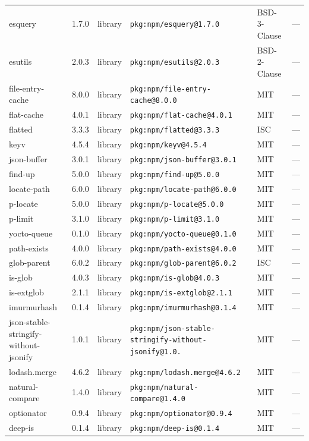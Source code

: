 \documentclass[11pt]{article}
\begin{document}
\begin{longtable}{|l|l|l|p{2.2cm}|l|p{4cm}|}
esquery & 1.7.0 & library & \texttt{pkg:npm/esquery@1.7.0} & BSD-3-Clause & — \\
esutils & 2.0.3 & library & \texttt{pkg:npm/esutils@2.0.3} & BSD-2-Clause & — \\
file-entry-cache & 8.0.0 & library & \texttt{pkg:npm/file-entry-cache@8.0.0} & MIT & — \\
flat-cache & 4.0.1 & library & \texttt{pkg:npm/flat-cache@4.0.1} & MIT & — \\
flatted & 3.3.3 & library & \texttt{pkg:npm/flatted@3.3.3} & ISC & — \\
keyv & 4.5.4 & library & \texttt{pkg:npm/keyv@4.5.4} & MIT & — \\
json-buffer & 3.0.1 & library & \texttt{pkg:npm/json-buffer@3.0.1} & MIT & — \\
find-up & 5.0.0 & library & \texttt{pkg:npm/find-up@5.0.0} & MIT & — \\
locate-path & 6.0.0 & library & \texttt{pkg:npm/locate-path@6.0.0} & MIT & — \\
p-locate & 5.0.0 & library & \texttt{pkg:npm/p-locate@5.0.0} & MIT & — \\
p-limit & 3.1.0 & library & \texttt{pkg:npm/p-limit@3.1.0} & MIT & — \\
yocto-queue & 0.1.0 & library & \texttt{pkg:npm/yocto-queue@0.1.0} & MIT & — \\
path-exists & 4.0.0 & library & \texttt{pkg:npm/path-exists@4.0.0} & MIT & — \\
glob-parent & 6.0.2 & library & \texttt{pkg:npm/glob-parent@6.0.2} & ISC & — \\
is-glob & 4.0.3 & library & \texttt{pkg:npm/is-glob@4.0.3} & MIT & — \\
is-extglob & 2.1.1 & library & \texttt{pkg:npm/is-extglob@2.1.1} & MIT & — \\
imurmurhash & 0.1.4 & library & \texttt{pkg:npm/imurmurhash@0.1.4} & MIT & — \\
json-stable-stringify-without-jsonify & 1.0.1 & library & \texttt{pkg:npm/json-stable-stringify-without-jsonify@1.0.} & MIT & — \\
lodash.merge & 4.6.2 & library & \texttt{pkg:npm/lodash.merge@4.6.2} & MIT & — \\
natural-compare & 1.4.0 & library & \texttt{pkg:npm/natural-compare@1.4.0} & MIT & — \\
optionator & 0.9.4 & library & \texttt{pkg:npm/optionator@0.9.4} & MIT & — \\
deep-is & 0.1.4 & library & \texttt{pkg:npm/deep-is@0.1.4} & MIT & — \\

\end{longtable}
\end{document}
